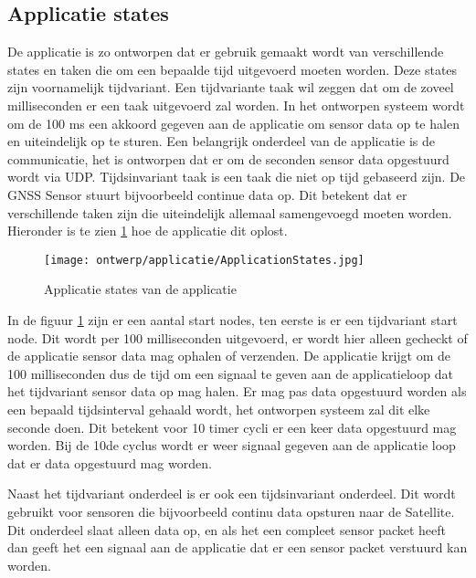\subsection{Applicatie states}
De applicatie is zo ontworpen dat er gebruik gemaakt wordt van verschillende states en taken die om een bepaalde tijd uitgevoerd moeten worden. Deze states zijn voornamelijk tijdvariant. Een tijdvariante taak wil zeggen dat om de zoveel milliseconden er een taak uitgevoerd zal worden. In het ontworpen systeem wordt om de 100 ms een akkoord gegeven aan de applicatie om sensor data op te halen en uiteindelijk op te sturen. Een belangrijk onderdeel van de applicatie is de communicatie, het is ontworpen dat er om de seconden sensor data opgestuurd wordt via UDP. Tijdsinvariant taak is een taak die niet op tijd gebaseerd zijn. De GNSS Sensor stuurt bijvoorbeeld continue data op. Dit betekent dat er verschillende taken zijn die uiteindelijk allemaal samengevoegd moeten worden. Hieronder is te zien \ref{fig:appstates} hoe de applicatie dit oplost. \newline

\begin{figure}[h!]
	\centering
	\label{fig:appstates}

	\texttt{[image: ontwerp/applicatie/ApplicationStates.jpg]}
	\caption{Applicatie states van de applicatie}
\end{figure}

\noindent In de figuur \ref{fig:appstates} zijn er een aantal start nodes, ten eerste is er een tijdvariant start node. Dit wordt per 100 milliseconden uitgevoerd, er wordt hier alleen gecheckt of de applicatie sensor data mag ophalen of verzenden. De applicatie krijgt om de 100 milliseconden dus de tijd om een signaal te geven aan de applicatieloop dat het tijdvariant sensor data op mag halen. Er mag pas data opgestuurd worden als een bepaald tijdsinterval gehaald wordt, het ontworpen systeem zal dit elke seconde doen. Dit betekent voor 10 timer cycli er een keer data opgestuurd mag worden. Bij de 10de cyclus wordt er weer signaal gegeven aan de applicatie loop dat er data opgestuurd mag worden. \newline

\noindent Naast het tijdvariant onderdeel is er ook een tijdsinvariant onderdeel. Dit wordt gebruikt voor sensoren die bijvoorbeeld continu data opsturen naar de Satellite. Dit onderdeel slaat alleen data op, en als het een compleet sensor packet heeft dan geeft het een signaal aan de applicatie dat er een sensor packet verstuurd kan worden. \newline

